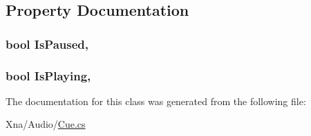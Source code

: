 \subsection{Property Documentation}
\hypertarget{classMicrosoft_1_1Xna_1_1Framework_1_1Audio_1_1Cue_af0cfdad2000f6666b74f837342ede53d}{}
\subsubsection[{Is\+Paused}]{\setlength{\rightskip}{0pt plus 5cm}bool Is\+Paused\hspace{0.3cm}{\ttfamily [get]}, {\ttfamily [set]}}\label{classMicrosoft_1_1Xna_1_1Framework_1_1Audio_1_1Cue_af0cfdad2000f6666b74f837342ede53d}
\hypertarget{classMicrosoft_1_1Xna_1_1Framework_1_1Audio_1_1Cue_aa3a66cc799248a4384240e006bb9ef1d}{}
\subsubsection[{Is\+Playing}]{\setlength{\rightskip}{0pt plus 5cm}bool Is\+Playing\hspace{0.3cm}{\ttfamily [get]}, {\ttfamily [set]}}\label{classMicrosoft_1_1Xna_1_1Framework_1_1Audio_1_1Cue_aa3a66cc799248a4384240e006bb9ef1d}


The documentation for this class was generated from the following file\+:\begin{DoxyCompactItemize}
\item 
Xna/\+Audio/\hyperlink{Cue_8cs}{Cue.\+cs}\end{DoxyCompactItemize}
